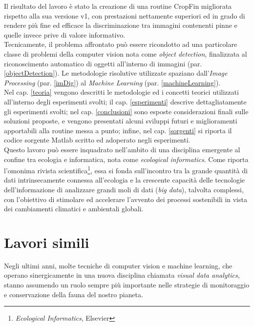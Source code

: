 Il risultato del lavoro è stato la creazione di una routine CropFin migliorata rispetto alla sua versione v1, con prestazioni nettamente superiori ed in grado di rendere più fine ed efficace la discriminazione tra immagini contenenti pinne e quelle invece prive di valore informativo.\\

Tecnicamente, il problema affrontato può essere ricondotto ad una particolare classe
di problemi della computer vision nota come \textit{object detection}, finalizzata al riconoscimento
automatico di oggetti all’interno di immagini (par. \ref{objectDetection}).
Le metodologie risolutive utilizzate spaziano dall’\textit{Image Processing} (par. \ref{imDig}) al \textit{Machine
Learning} (par. \ref{machineLearning}).\\

Nel cap. \ref{teoria} vengono descritti le metodologie ed i concetti teorici utilizzati all'interno degli esperimenti svolti; il cap. \ref{esperimenti} descrive dettagliatamente gli esperimenti svolti; nel cap. \ref{conclusioni} sono esposte
considerazioni finali sulle soluzioni proposte, e vengono presentati alcuni sviluppi futuri e miglioramenti apportabili alla routine messa a punto; infine, nel cap. \ref{sorgenti} si riporta il codice sorgente Matlab scritto ed adoperato negli esperimenti.\\

Questo lavoro può essere inquadrato nell’ambito di una disciplina emergente al
confine tra ecologia e informatica, nota come \textit{ecological informatics}.
Come riporta l’omonima rivista scientifica\footnote{\textit{Ecological Informatics}, Elsevier}, essa si fonda sull’incontro tra la
grande quantità di dati intrinsecamente connessa all’ecologia e la crescente capacità
delle tecnologie dell’informazione di analizzare grandi moli di dati (\textit{big data}), talvolta complessi, con l’obiettivo di stimolare ed accelerare
l’avvento dei processi sostenibili in vista dei cambiamenti climatici e ambientali
globali.\\

\section{Lavori simili}
\label{lavorisimili}
Negli ultimi anni, molte tecniche di computer vision e machine learning, che operano sinergicamente in una nuova disciplina chiamata \textit{visual data analytics}, stanno assumendo un ruolo sempre più importante nelle strategie di monitoraggio e conservazione della fauna del nostro pianeta.

